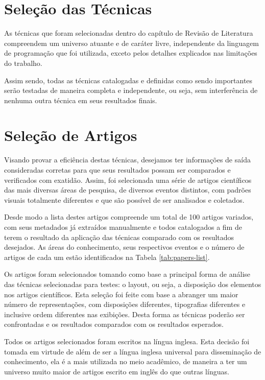\documentclass[
	12pt,               %
	openright,          %
	twoside,            %
	a4paper,            %
	english,            %
	brazil              %
	]{abntex2}
\begin{document}
\section{Seleção das Técnicas}

As técnicas que foram selecionadas dentro do capítulo de Revisão de Literatura compreendem um universo atuante e de caráter livre, independente da linguagem de programação que foi utilizada, exceto pelos detalhes explicados nas limitações do trabalho.

Assim sendo, todas as técnicas catalogadas e definidas como sendo importantes serão testadas de maneira completa e independente, ou seja, sem interferência de nenhuma outra técnica em seus resultados finais.


\section{Seleção de Artigos}

Visando provar a eficiência destas técnicas, desejamos ter informações de saída consideradas corretas para que seus resultados possam ser comparados e verificados com exatidão. Assim, foi selecionada uma série de artigos científicos das mais diversas áreas de pesquisa, de diversos eventos distintos, com padrões visuais totalmente diferentes e que são possível de ser analisados e coletados.


Desde modo a lista destes artigos compreende um total de 100 artigos variados, com seus metadados já extraídos manualmente e todos catalogados a fim de terem o resultado da aplicação das técnicas comparado com os resultados desejados. As áreas do conhecimento, seus respectivos eventos e o número de artigos de cada um estão identificados na Tabela \ref{tab:papers-list}.

Os artigos foram selecionados tomando como base a principal forma de análise das técnicas selecionadas para testes: o layout, ou seja, a disposição dos elementos nos artigos científicos. Esta seleção foi feite com base a abranger um maior número de representações, com disposições diferentes, tipografias diferentes e inclusive ordem diferentes nas exibições. Desta forma as técnicas poderão ser confrontadas e os resultados comparados com os resultados esperados.


Todos os artigos selecionados foram escritos na língua inglesa. Esta decisão foi tomada em virtude de além de ser a língua inglesa universal para disseminação de conhecimento, ela é a mais utilizada no meio acadêmico, de maneira a ter um universo muito maior de artigos escrito em inglês do que outras línguas.
\end{document}
